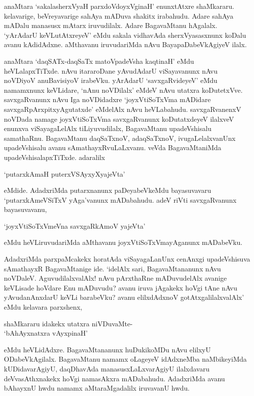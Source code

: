 anaMtara `sakalasherxVyaH parxdoVdoyxVginaH' enunxtAtxre shaMkararu. kelavarige, beVreyavarige sahAya mADuva shakitx irabahudu. Adare sahAya mADalu manasusx mAtarx iruvudilalx. Adare BagavaMtanu hAgalalx. `yArAdarU keVLutAtxreyeV' eMdu sakala vidhavAda sherxVyasasxnunx koDalu avanu kAdidAdxne. aMthavanu iruvudariMda nAvu BayapaDabeVkAgiyeV ilalx.

anaMtara `daqSATx-daqSaTx matoVpadeVsha kaqtinaH' eMdu heVLalapxTiTxde. nAvu itararoDane yAvudAdarU viSayavanunx nAvu noVDiyoV anuBavisiyoV irabeVku. yArAdarU `savxgaRvideyeV' eMdu namamxnunx keVLidare, `nAnu noVDilalx' eMdeV nAvu utatxra koDutetxVve. savxgaRvanunx nAvu Iga noVDidadxre `joyxVtiSoTxVma mADidare savxgaRpArxpitxyAgutatxde' eMdelAlx nAvu heVLabahudu. savxgaRvanenxV noVDada namage joyxVtiSoTxVma savxgaRvanunx koDutatxdeyeV ilalxveV enunxva viSayagaLelAlx tiLiyuvudilalx, BagavaMtanu upadeVshisalu samathaRnu. BagavaMtanu daqSaTxnoV, adaqSaTxnoV, ivugaLelalxvanUnx upadeVshisalu avanu sAmathayxRvuLaLxvanu. veVda BagavaMtaniMda upadeVshisalapxTiTxde. adaralilx

\begin{shloka}
`putarxkAmaH puterxVSAyxyXyajeVta'
\end{shloka}

\noindent eMdide. AdadxriMda putarxnanunx paDeyabeVkeMdu bayasuvavaru `putarxkAmeVSiTxV yAga'vanunx mADabahudu. adeV riVti savxgaRvanunx bayasuvavanu,

\begin{shloka}
`joyxVtiSoTxVmeVna savxgaRkAmoV yajeVta'
\end{shloka}

\noindent eMdu heVLiruvudariMda aMthavanu joyxVtiSoTxVmayAganunx mADabeVku.

AdadxriMda parxpaMcakekx horatAda viSayagaLanUnx cenAnxgi upadeVshisuva sAmathayxR BagavaMtanige ide. `idelAlx sari, BagavaMtananunx nAvu noVDaleV. AguvudilalxvalAlx! nAvu pArxthaRne mADuvudelAlx avanige keVLisade hoVdare Enu mADuvudu? avanu iruva jAgakekx hoVgi tAne nAvu yAvudanAnxdarU keVLi barabeVku? avanu elilxdAdxnoV gotAtxgalilalxvalAlx' eMdu kelavara parxshenx,

\begin{center}
shaMkararu idakekx utatxra niVDuvaMte-\\
`bAhAyxnatxra vAyxpinaH'
\end{center}

eMdu heVLidAdxre. BagavaMtananunx huDukikoMDu nAvu elilxyU ODabeVkAgilalx. BagavaMtanu namamx oLageyeV idAdxneMba naMbikeyiMda kUDidavarAgiyU, daqDhavAda manasusxLaLxvarAgiyU ilalxdavaru deVvasAthxnakekx hoVgi namasAkxra mADabahudu. AdadxriMda avanu bAhayxnU hwdu namamx aMtaraMgadalilx iruvavanU hwdu.


